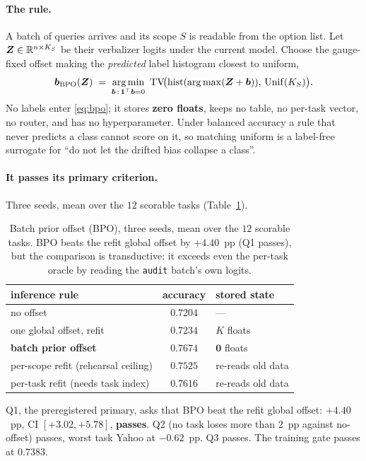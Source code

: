 \paragraph{The rule.}
A batch of queries arrives and its scope $S$ is readable from the option list. Let
$\bm{Z}\in\mathbb{R}^{n\times K_S}$ be their verbalizer logits under the current model. Choose
the gauge-fixed offset making the \emph{predicted} label histogram closest to uniform,
\begin{equation}
  \bm{b}_{\mathrm{BPO}}(\bm{Z})\;=\;\operatorname*{arg\,min}_{\bm{b}\,:\,\bm{1}^\top\bm{b}=0}\
  \mathrm{TV}\!\big(\mathrm{hist}(\operatorname*{arg\,max}(\bm{Z}+\bm{b})),\,\mathrm{Unif}(K_S)\big).
  \label{eq:bpo}
\end{equation}
No labels enter \eqref{eq:bpo}; it stores \textbf{zero floats}, keeps no table, no
per-task vector, no router, and has no hyperparameter. Under balanced accuracy a
rule that never predicts a class cannot score on it, so matching uniform is a
label-free surrogate for ``do not let the drifted bias collapse a class''.

\paragraph{It passes its primary criterion.}
Three seeds, mean over the $12$ scorable tasks (Table~\ref{tab:bpo-levels}).
\begin{table}[t]
\centering
\small
\caption{Batch prior offset (BPO), three seeds, mean over the $12$ scorable tasks.
BPO beats the refit global offset by $+4.40$~pp (Q1 passes), but the comparison is
transductive: it exceeds even the per-task oracle by reading the \texttt{audit}
batch's own logits.}
\label{tab:bpo-levels}
\begin{tabular}{lcl}
\toprule
inference rule & accuracy & stored state \\
\midrule
no offset                            & $0.7204$ & --- \\
one global offset, refit             & $0.7234$ & $K$ floats \\
\textbf{batch prior offset}          & $\mathbf{0.7674}$ & $\mathbf{0}$ floats \\
per-scope refit (rehearsal ceiling)  & $0.7525$ & re-reads old data \\
per-task refit (needs task index)    & $0.7616$ & re-reads old data \\
\bottomrule
\end{tabular}
\end{table}
Q1, the preregistered primary, asks that BPO beat the refit global offset:
$\mathbf{+4.40}$~pp, CI $[+3.02,+5.78]$, \textbf{passes}. Q2 (no task loses more
than $2$~pp against no-offset) passes, worst task Yahoo at $-0.62$~pp. Q3 passes.
The training gate passes at $0.7383$.

